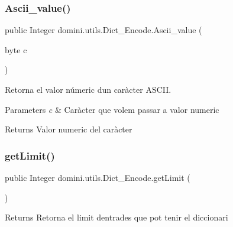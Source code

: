 \subsubsection{\texorpdfstring{Ascii\+\_\+value()}{Ascii\_value()}}
{\footnotesize\ttfamily public Integer domini.\+utils.\+Dict\+\_\+\+Encode.\+Ascii\+\_\+value (\begin{DoxyParamCaption}\item[{byte}]{c }\end{DoxyParamCaption})\hspace{0.3cm}{\ttfamily [inline]}}



Retorna el valor númeric d\textquotesingle{}un caràcter A\+S\+C\+II. 


\begin{DoxyParams}{Parameters}
{\em c} & Caràcter que volem passar a valor numeric \\
\hline
\end{DoxyParams}
\begin{DoxyReturn}{Returns}
Valor numeric del caràcter 
\end{DoxyReturn}
\mbox{\label{classdomini_1_1utils_1_1Dict__Encode_a21a05b62b848a7ab9fbdf49a3a6e7edf}} 
\subsubsection{\texorpdfstring{get\+Limit()}{getLimit()}}
{\footnotesize\ttfamily public Integer domini.\+utils.\+Dict\+\_\+\+Encode.\+get\+Limit (\begin{DoxyParamCaption}{ }\end{DoxyParamCaption})\hspace{0.3cm}{\ttfamily [inline]}}

\begin{DoxyReturn}{Returns}
Retorna el limit d\textquotesingle{}entrades que pot tenir el diccionari 
\end{DoxyReturn}
\mbox{\label{classdomini_1_1utils_1_1Dict__Encode_a6c3016286b3bb242d12799f8e7ebb585}} 

